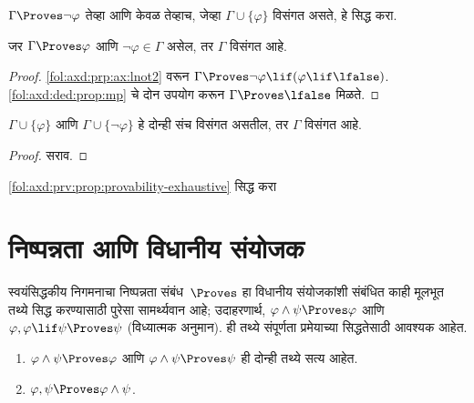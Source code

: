 \begin{prob}
$\Gamma \Proves \lnot \varphi$ तेव्हा आणि केवळ तेव्हाच, जेव्हा $\Gamma \cup \{\varphi\}$
विसंगत असते, हे सिद्ध करा.
\end{prob}

\begin{prop}\label{fol:axd:prv:prop:explicit-inc}
  जर $\Gamma \Proves \varphi$ आणि $\lnot \varphi \in \Gamma$ असेल, तर $\Gamma$
  विसंगत आहे.
\end{prop}

\begin{proof}
  \ref{fol:axd:prp:ax:lnot2} वरून $\Gamma \Proves \lnot \varphi \lif (\varphi \lif \lfalse)$.
  \ref{fol:axd:ded:prop:mp} चे दोन उपयोग करून $\Gamma \Proves \lfalse$ मिळते.
\end{proof}


\begin{prop}\label{fol:axd:prv:prop:provability-exhaustive}
  $\Gamma \cup \{\varphi\}$ आणि $\Gamma \cup \{\lnot \varphi\}$ हे दोन्ही संच
  विसंगत असतील, तर $\Gamma$ विसंगत आहे.
\end{prop}

\begin{proof}
सराव.
\end{proof}


\begin{prob}
  \ref{fol:axd:prv:prop:provability-exhaustive} सिद्ध करा
\end{prob}
















\section{निष्पन्नता आणि विधानीय संयोजक}\label{fol:axd:ppr:sec}

\begin{explain}
  स्वयंसिद्धकीय निगमनाचा निष्पन्नता संबंध~$\Proves$ हा विधानीय
  संयोजकांशी संबंधित काही मूलभूत तथ्ये सिद्ध करण्यासाठी पुरेसा सामर्थ्यवान
  आहे; उदाहरणार्थ, $\varphi \land \psi \Proves \varphi$ आणि $\varphi, \varphi \lif \psi
  \Proves \psi$ (विध्यात्मक अनुमान). ही तथ्ये संपूर्णता प्रमेयाच्या
  सिद्धतेसाठी आवश्यक आहेत.
\end{explain}

\begin{prop}\label{fol:axd:ppr:prop:provability-land}
  \begin{enumerate}
  \item \label{fol:axd:ppr:prop:provability-land-left} $\varphi \land \psi \Proves
    \varphi$ आणि $\varphi \land \psi \Proves \psi$ ही दोन्ही तथ्ये सत्य आहेत.
  \item \label{fol:axd:ppr:prop:provability-land-right} $\varphi, \psi \Proves \varphi \land \psi$.
  \end{enumerate}
\end{prop}

